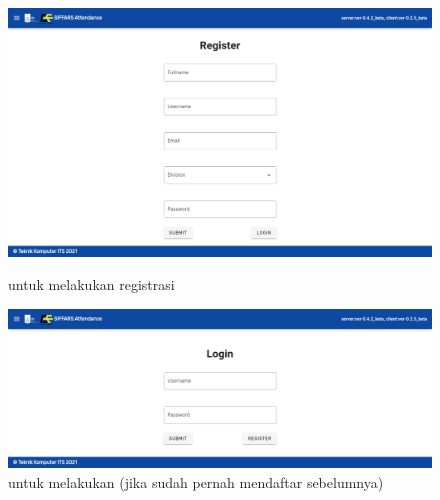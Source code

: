 \begin{figure} [p] \centering
  \includegraphics[scale=0.2]{gambar/register.png}
  \caption{ untuk melakukan registrasi}
  \label{fig:SfRegis}
  
  \includegraphics[scale=0.2]{gambar/login.png}
  \caption{ untuk melakukan  (jika sudah pernah mendaftar sebelumnya)}
  \label{fig:SfLogin}
\end{figure}

